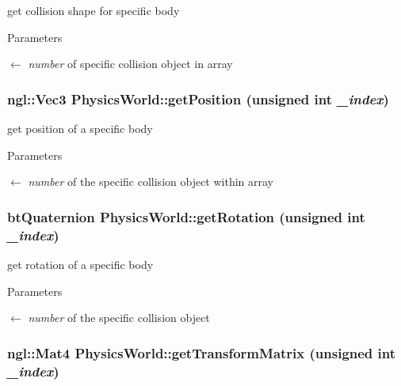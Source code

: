 get collision shape for specific body 
\begin{DoxyParams}{Parameters}
\item[\mbox{$\leftarrow$} {\em number}]of specific collision object in array \end{DoxyParams}
\hypertarget{classPhysicsWorld_a528a5fc5907a9bf3e8ab2bfe1be5b05f}{
\subsubsection[{getPosition}]{\setlength{\rightskip}{0pt plus 5cm}ngl::Vec3 PhysicsWorld::getPosition (unsigned int {\em \_\-index})}}
\label{classPhysicsWorld_a528a5fc5907a9bf3e8ab2bfe1be5b05f}


get position of a specific body 
\begin{DoxyParams}{Parameters}
\item[\mbox{$\leftarrow$} {\em number}]of the specific collision object within array \end{DoxyParams}
\hypertarget{classPhysicsWorld_a9e9d15147f52d67384d197bdbfddbedf}{
\subsubsection[{getRotation}]{\setlength{\rightskip}{0pt plus 5cm}btQuaternion PhysicsWorld::getRotation (unsigned int {\em \_\-index})}}
\label{classPhysicsWorld_a9e9d15147f52d67384d197bdbfddbedf}


get rotation of a specific body 
\begin{DoxyParams}{Parameters}
\item[\mbox{$\leftarrow$} {\em number}]of the specific collision object \end{DoxyParams}
\hypertarget{classPhysicsWorld_acef2efa13c576073a2a907709114422d}{
\subsubsection[{getTransformMatrix}]{\setlength{\rightskip}{0pt plus 5cm}ngl::Mat4 PhysicsWorld::getTransformMatrix (unsigned int {\em \_\-index})}}
\label{classPhysicsWorld_acef2efa13c576073a2a907709114422d}


